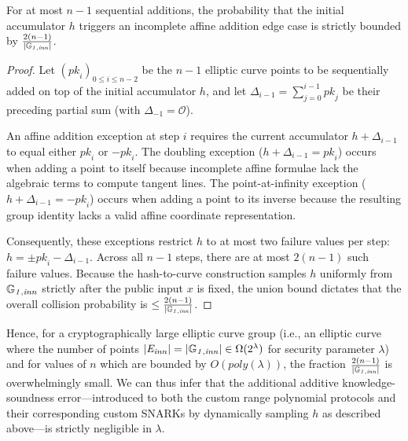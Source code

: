 \begin{lemma}
For at most $n-1$ sequential additions, the probability that the initial accumulator $h$ triggers an incomplete 
affine addition edge case is strictly bounded by $\frac{2(n-1)}{|\mathbb{G}_{\mathit{1,inn}}|}$.
\end{lemma}

\begin{proof}
Let $(\mathit{pk}_i)_{0 \leq i \leq n-2}$ be the $n-1$ elliptic curve points to be sequentially added on top of the initial accumulator $h$, 
and let $\Delta_{i-1} = \sum_{j=0}^{i-1} \mathit{pk}_j$ be their preceding partial sum (with $\Delta_{-1} = \mathcal{O}$). 

An affine addition exception at step $i$ requires the current accumulator $h + \Delta_{i-1}$ to equal either $\mathit{pk}_i$ or $-\mathit{pk}_i$. 
The doubling exception ($h + \Delta_{i-1} = \mathit{pk}_i$) occurs when adding a point to itself because incomplete affine formulae 
lack the algebraic terms to compute tangent lines. The point-at-infinity exception ($h + \Delta_{i-1} = -\mathit{pk}_i$) occurs when adding a point to 
its inverse because the resulting group identity lacks a valid affine coordinate representation. 

Consequently, these exceptions restrict $h$ to at most two failure values per step: $h = \pm \mathit{pk}_i - \Delta_{i-1}$. 
Across all $n-1$ steps, there are at most $2(n-1)$ such failure values. Because the hash-to-curve construction samples 
$h$ uniformly from $\mathbb{G}_{\mathit{1,inn}}$ strictly after the public input $x$ is fixed, the union bound dictates that the overall collision probability 
is $\le \frac{2(n-1)}{|\mathbb{G}_{\mathit{1,inn}}|}$. 
\end{proof}

Hence, for a cryptographically large elliptic curve group (i.e., an elliptic curve where the number of points 
$|\mathit{E}_{\mathit{inn}}| = |\mathbb{G}_{\mathit{1,inn}}| \in \Omega(2^{\lambda})$ for security parameter $\lambda$) and for values of $n$ which are 
bounded by $O(\mathit{poly}(\lambda))$, the fraction $\frac{2(n-1)}{|\mathbb{G}_{\mathit{1,inn}}|}$ is overwhelmingly small. 
We can thus infer that the additional additive knowledge-soundness error—introduced to both the custom 
range polynomial protocols and their corresponding custom SNARKs by dynamically sampling $h$ as 
described above—is strictly negligible in $\lambda$.

